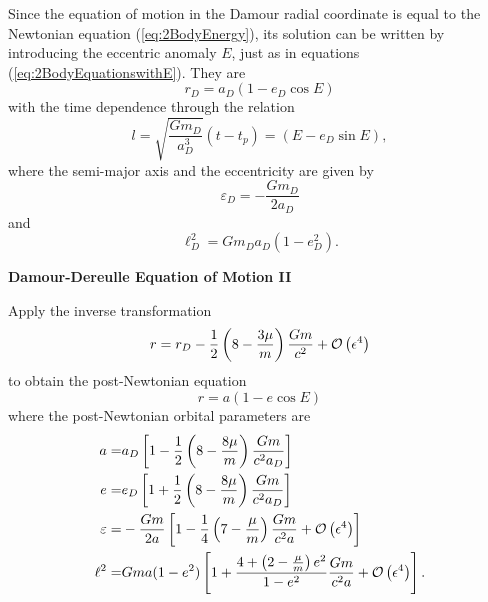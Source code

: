 Since the equation of motion in the Damour radial coordinate is equal to the Newtonian equation (\ref{eq:2BodyEnergy}), its solution can be written by introducing the eccentric anomaly $E$, just as in equations (\ref{eq:2BodyEquationswithE}). They are
\begin{equation}
r_D = a_D(1-e_D \cos E)
\end{equation}
with the time dependence through the relation
\begin{equation}
l = \sqrt{\frac{Gm_D}{a_D^3}} \left( t-t_p \right) =  \left( E - e_D \sin E \right),
\end{equation}
where the semi-major axis and the eccentricity are given by
\begin{equation}
\varepsilon_D = - \frac{Gm_D}{2a_D}
\end{equation}
and
\begin{equation}
\ell_D^2 = Gm_D a_D \left( 1- e_D^2 \right).
\end{equation}

\begin{exercise}
\textbf{Damour-Dereulle Equation of Motion II}

Apply the inverse transformation
\begin{equation}
r = r_D - \frac{1}{2} \left( 8-\frac{3\mu}{m} \right) \frac{Gm}{c^2} + {\mathcal{O}} \left( \epsilon^4 \right)
\end{equation}
to obtain the post-Newtonian equation
\begin{equation}
r = a \left( 1 - e \cos E \right) 
\end{equation}
where the post-Newtonian orbital parameters are
\begin{align}
a = &a_D \left[ 1 - \frac{1}{2} \left( 8 - \frac{8\mu}{m} \right) \frac{Gm}{c^2 a_D} \right] \\
e = & e_D \left[ 1+ \frac{1}{2} \left( 8 - \frac{8\mu}{m} \right) \frac{Gm}{c^2 a_D} \right] \\
\varepsilon = &-\frac{Gm}{2a} \left[ 1- \frac{1}{4} \left( 7 - \frac{\mu}{m} \right) \frac{Gm}{c^2 a} + {\mathcal{O}} \left( \epsilon^4 \right) \right] \\
\ell ^2 = & Gma (1-e^2) \left[ 1+ \frac{4 + \left( 2 - \frac{\mu}{m} \right)e^2}{1-e^2} \frac{Gm}{c^2 a} + {\mathcal{O}} \left( \epsilon^4 \right) \right].
\end{align}

\end{exercise}













